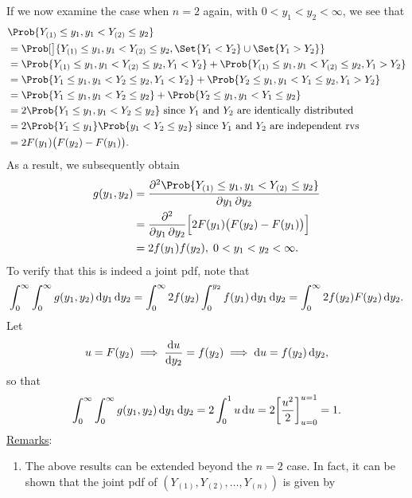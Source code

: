 \begin{Regular}
    If we now examine the case when $ n=2 $ again, with $ 0<y_1<y_2<\infty $, we see that
    \begin{align*}
         & \Prob{Y_{(1)}\le y_1,y_1<Y_{(2)}\le y_2}                                                           \\
         & =\Prob[\big]{Y_{(1)}\le y_1,y_1<Y_{(2)}\le y_2, \Set{Y_1<Y_2}\cup \Set{Y_1>Y_2} }                  \\
         & =\Prob{Y_{(1)}\le y_1,y_1<Y_{(2)}\le y_2,Y_1<Y_2}+\Prob{Y_{(1)}\le y_1,y_1<Y_{(2)}\le y_2,Y_1>Y_2} \\
         & =\Prob{Y_1\le y_1,y_1<Y_2\le y_2,Y_1<Y_2}+\Prob{Y_2\le y_1,y_1<Y_1\le y_2,Y_1>Y_2}                 \\
         & =\Prob{Y_1\le y_1,y_1<Y_2\le y_2}+\Prob{Y_2\le y_1,y_1<Y_1\le y_2}                                 \\
         & =2\Prob{Y_1\le y_1,y_1<Y_2\le y_2}\text{ since $ Y_1 $ and $ Y_2 $ are identically distributed}    \\
         & =2\Prob{Y_1\le y_1}\Prob{y_1<Y_2\le y_2}\text{ since $ Y_1 $ and $ Y_2 $ are independent rvs}      \\
         & =2F(y_1)\bigl(F(y_2)-F(y_1)\bigr).
    \end{align*}
    As a result, we subsequently obtain
    \begin{align*}
        g(y_1,y_2)
         & = \pdv{\Prob{Y_{(1)}\le y_1,y_1<Y_{(2)}\le y_2}}{y_1,y_2}     \\
         & =\pdv*{\Bigl[2F(y_1)\bigl(F(y_2)-F(y_1)\bigr)\Bigr]}{y_1,y_2} \\
         & =2f(y_1)f(y_2),\; 0<y_1<y_2<\infty.
    \end{align*}
    To verify that this is indeed a joint pdf, note that
    \[ \int_{0}^{\infty}\int_{0}^{\infty}g(y_1,y_2)\odif{y_1}\odif{y_2}
        =\int_{0}^{\infty}2f(y_2)\int_{0}^{y_2}f(y_1)\odif{y_1}\odif{y_2}
        =\int_{0}^{\infty}2f(y_2)F(y_2)\odif{y_2}. \]
    Let
    \[ u=F(y_2)\implies\odv{u}{y_2}=f(y_2)\implies \odif{u}=f(y_2)\odif{y_2}, \]
    so that
    \[ \int_{0}^{\infty}\int_{0}^{\infty}g(y_1,y_2)\odif{y_1}\odif{y_2}=2 \int_{0}^{1}u\odif{u}
        =2\biggl[\frac{u^2}{2}\biggr]_{u=0}^{u=1}=1. \]
    \tcblower{}
    \underline{Remarks}:
    \begin{enumerate}[(1)]
        \item The above results can be extended beyond the $n = 2$ case. In fact, it can be shown that
              the joint pdf of $ (Y_{(1)},Y_{(2)},\ldots,Y_{(n)}) $ is given by

\end{enumerate}
\end{Regular}
